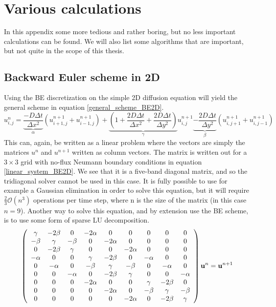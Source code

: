 \section{Various calculations}

In this appendix some more tedious and rather boring, but no less important calculations can be found. 
We will also list some algorithms that are important, but not quite in the scope of this thesis.

\subsection{Backward Euler scheme in 2D}

Using the BE discretization on the simple 2D diffusion equation will yield the general scheme in equation \ref{general_scheme_BE2D}.
\begin{equation}\label{general_scheme_BE2D}
 u^{n}_{i,j} = \underbrace{\frac{-D\Delta t}{\Delta x^2}}_{\alpha}\left(u^{n+1}_{i+1,j}+u^{n+1}_{i-1,j}\right) +
 \underbrace{\left(1+\frac{2D\Delta t}{\Delta x^2} +\frac{2D\Delta t}{\Delta y^2}\right)}_{\gamma}u^{n+1}_{i,j} 
 \underbrace{-\frac{2D\Delta t}{\Delta y^2}}_{\beta}\left(u^{n+1}_{i,j+1}+u^{n+1}_{i,j-1}\right)
\end{equation}
This can, again, be written as a linear problem where the vectors are simply the matrices $u^n$ and $u^{n+1}$ written as column vectors. 
The matrix is written out for a $3\times3$ grid with no-flux Neumann boundary conditions in equation \ref{linear_system_BE2D}. 
We see that it is a five-band diagonal matrix, and so the tridiagonal solver cannot be used in this case. It is fully possible to use for example a Gaussian elimination in order to solve this equation, but it will require $\frac{2}{3}\mathcal{O}(n^3)$ operations per time step, where n is the size of the matrix (in this case $n=9$). 
Another way to solve this equation, and by extension use the BE scheme, is to use some form of sparse LU decomposition.
\begin{align}\label{linear_system_BE2D}
  \left(\begin{array}{c c c c c c c c c}
        \gamma & -2\beta &0 &-2\alpha &0 &0 &0 &0 &0\\
        -\beta & \gamma & -\beta &0 &-2\alpha &0 &0 &0 &0\\
        0&-2\beta & \gamma & 0 & 0 & -2\alpha &0&0&0\\
        -\alpha& 0&0 & \gamma & -2\beta & 0 & -\alpha &0&0\\
        0& -\alpha&0&-\beta & \gamma & -\beta & 0 & -\alpha &0\\
        0& 0& -\alpha&0&-2\beta & \gamma & 0 & 0 &-\alpha\\
        0& 0 &0 &-2\alpha &0&0 & \gamma & -2\beta&0\\
        0& 0 &0 &0 &-2\alpha&0&-\beta & \gamma &-\beta\\
         0&0 &0 &0&0 &-2\alpha&0&-2\beta & \gamma
       \end{array}\right)\mathbf{u}^{n} = \mathbf{u}^{n+1}
\end{align}
